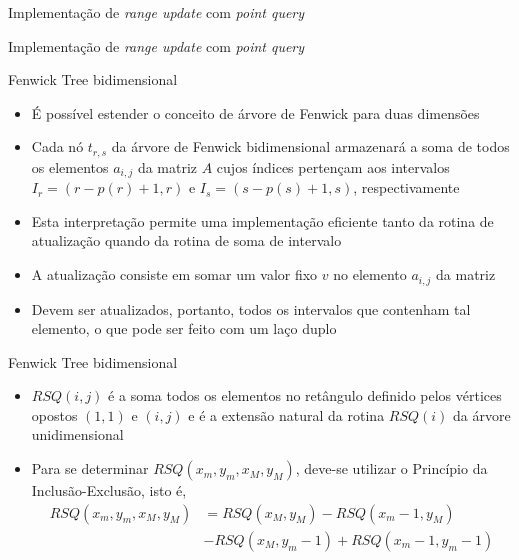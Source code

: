 \begin{frame}[fragile]{Implementação de {\it range update} com {\it point query}}
\end{frame}

\begin{frame}[fragile]{Implementação de {\it range update} com {\it point query}}
\end{frame}

\begin{frame}[fragile]{Fenwick Tree bidimensional}

    \begin{itemize}
        \item É possível estender o conceito de árvore de Fenwick para duas dimensões

        \item Cada nó $t_{r,s}$ da árvore de Fenwick bidimensional armazenará a soma de todos
            os elementos $a_{i,j}$ da matriz $A$ cujos índices pertençam aos intervalos
            $I_r = (r - p(r) + 1, r)$ e $I_s = (s - p(s) + 1, s)$, respectivamente

        \item Esta interpretação permite uma implementação eficiente tanto da rotina de 
            atualização quando da rotina de soma de intervalo

        \item A atualização consiste em somar um valor fixo $v$ no elemento $a_{i,j}$ da matriz

        \item Devem ser atualizados, portanto, todos os intervalos que contenham tal elemento,
            o que pode ser feito com um laço duplo
    \end{itemize}

\end{frame}

\begin{frame}[fragile]{Fenwick Tree bidimensional}

    \begin{itemize}
        \item $RSQ(i, j)$ é a soma todos os elementos no retângulo definido pelos vértices
            opostos $(1, 1)$ e $(i, j)$ e é a extensão natural da rotina $RSQ(i)$ da árvore
            unidimensional

        \item Para se determinar $RSQ(x_m, y_m, x_M, y_M)$, deve-se utilizar o Princípio da
            Inclusão-Exclusão, isto é,
        \begin{align*}
            RSQ(x_m, y_m, x_M, y_M) &= RSQ(x_M, y_M) - RSQ(x_m - 1, y_M) \\
                &- RSQ(x_M, y_m - 1) + RSQ(x_m - 1, y_m - 1)
        \end{align*}
    \end{itemize}
\end{frame}

